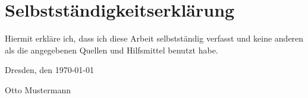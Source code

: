 
\section*{\vfill{} \thispagestyle{empty}
Selbstständigkeitserklärung}

Hiermit erkläre ich, dass ich diese Arbeit selbstständig verfasst
und keine anderen als die angegebenen Quellen und Hilfsmittel benutzt habe.
\bigskip{}

\noindent Dresden, den \today %
\vspace{2.5cm}

\noindent Otto Mustermann \cleardoublepage{}
